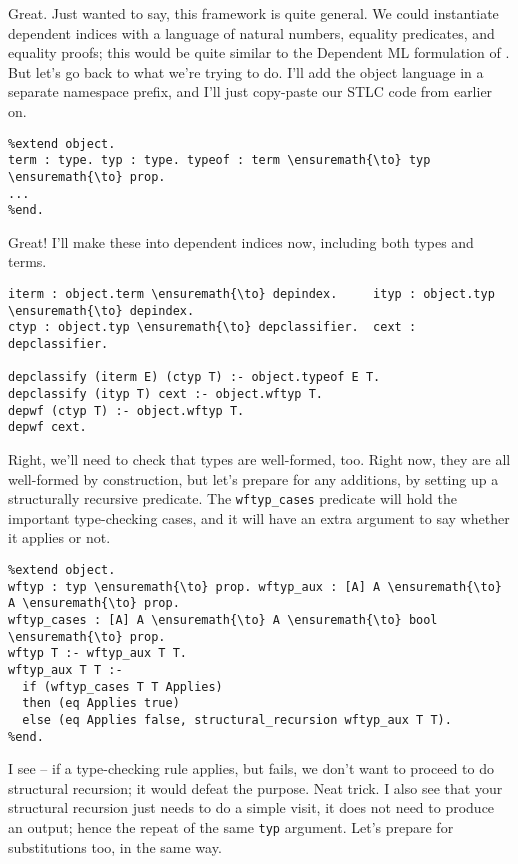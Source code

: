 \heroADVISOR{} Great. Just wanted to say, this framework is quite general. We
could instantiate dependent indices with a language of natural numbers,
equality predicates, and equality proofs; this would be quite similar to
the Dependent ML formulation of \citet{licata2005formulation}. But let's
go back to what we're trying to do. I'll add the object language in a
separate namespace prefix, and I'll just copy-paste our STLC code from
earlier on.

\begin{verbatim}
%extend object.
term : type. typ : type. typeof : term \ensuremath{\to} typ \ensuremath{\to} prop.
...
%end.
\end{verbatim}

\heroSTUDENT{} Great! I'll make these into dependent indices now, including
both types and terms.

\begin{verbatim}
iterm : object.term \ensuremath{\to} depindex.     ityp : object.typ \ensuremath{\to} depindex.
ctyp : object.typ \ensuremath{\to} depclassifier.  cext : depclassifier.

depclassify (iterm E) (ctyp T) :- object.typeof E T.
depclassify (ityp T) cext :- object.wftyp T.
depwf (ctyp T) :- object.wftyp T.
depwf cext.
\end{verbatim}

\heroADVISOR{} Right, we'll need to check that types are well-formed, too.
Right now, they are all well-formed by construction, but let's prepare
for any additions, by setting up a structurally recursive predicate. The
\texttt{wftyp\_cases} predicate will hold the important type-checking
cases, and it will have an extra argument to say whether it applies or
not.

\begin{verbatim}
%extend object.
wftyp : typ \ensuremath{\to} prop. wftyp_aux : [A] A \ensuremath{\to} A \ensuremath{\to} prop.
wftyp_cases : [A] A \ensuremath{\to} A \ensuremath{\to} bool \ensuremath{\to} prop.
wftyp T :- wftyp_aux T T.
wftyp_aux T T :-
  if (wftyp_cases T T Applies)
  then (eq Applies true)
  else (eq Applies false, structural_recursion wftyp_aux T T).
%end.
\end{verbatim}

\heroSTUDENT{} I see -- if a type-checking rule applies, but fails, we don't
want to proceed to do structural recursion; it would defeat the purpose.
Neat trick. I also see that your structural recursion just needs to do a
simple visit, it does not need to produce an output; hence the repeat of
the same \texttt{typ} argument. Let's prepare for substitutions too, in
the same way.

